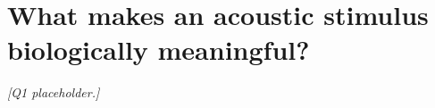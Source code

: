 \section{What makes an acoustic stimulus biologically meaningful?}
\label{sec:q1}


\textit{[Q1 placeholder.]}
